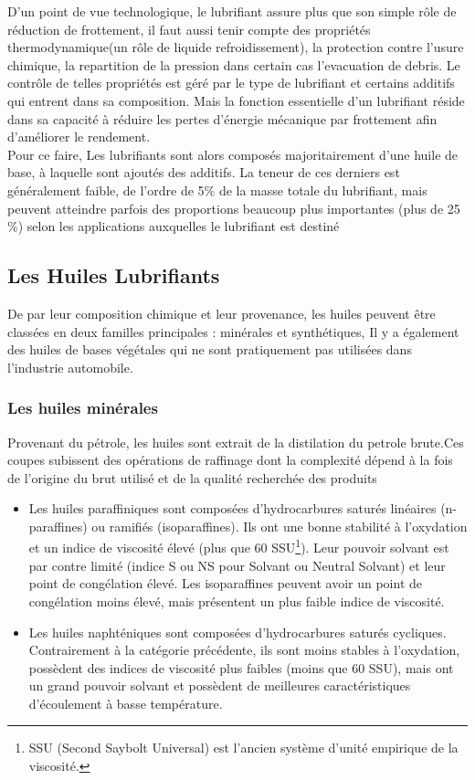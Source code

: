 D’un point de vue technologique, le lubrifiant assure plus que son simple rôle de réduction de frottement, il faut aussi tenir compte des propriétés thermodynamique(un rôle de liquide refroidissement), la protection contre l'usure chimique, la repartition de la pression dans certain cas l'evacuation de debris. Le contrôle de telles propriétés est géré par le type de lubrifiant et certains additifs qui entrent dans sa composition. Mais la fonction essentielle d’un lubrifiant réside dans sa capacité à réduire les pertes d’énergie mécanique par frottement afin d’améliorer le rendement.\\

Pour ce faire, Les lubrifiants sont alors composés majoritairement d’une huile de base, à laquelle sont ajoutés des additifs. La teneur de ces derniers est généralement faible, de l’ordre de 5$\%$ de la masse totale du lubrifiant, mais peuvent atteindre parfois des proportions beaucoup plus importantes (plus de 25$\%$) selon les applications auxquelles le lubrifiant est destiné\cite{Amal}

\subsection{Les Huiles Lubrifiants}
De par leur composition chimique et leur provenance, les huiles peuvent être classées en deux familles principales : minérales et synthétiques, Il y a également des huiles de bases végétales qui ne sont pratiquement pas utilisées dans l’industrie automobile.\cite{initiation}

\subsubsection{Les huiles minérales}
Provenant du pétrole, les huiles sont extrait de la distilation du petrole brute.Ces coupes subissent des opérations de raffinage dont la complexité dépend à la fois de l’origine du brut utilisé et de la qualité recherchée des produits
\begin{itemize}
	\item Les huiles paraffiniques sont composées d’hydrocarbures saturés linéaires (n-paraffines) ou ramifiés (isoparaffines). Ils ont une bonne stabilité à l’oxydation et un indice de viscosité élevé
	(plus que 60 SSU\footnote{SSU (Second Saybolt Universal) est l'ancien système d'unité empirique de la viscosité.}). Leur pouvoir solvant est par contre limité (indice S ou NS pour Solvant ou Neutral Solvant) et leur point de congélation élevé. Les isoparaffines peuvent avoir un point de
	congélation moins élevé, mais présentent un plus faible indice de viscosité.
	\item Les huiles naphténiques sont composées d’hydrocarbures saturés cycliques. Contrairement à
	la catégorie précédente, ils sont moins stables à l’oxydation, possèdent des indices de viscosité
	plus faibles (moins que 60 SSU), mais ont un grand pouvoir solvant et possèdent de meilleures
	caractéristiques d’écoulement à basse température.
\end{itemize}

